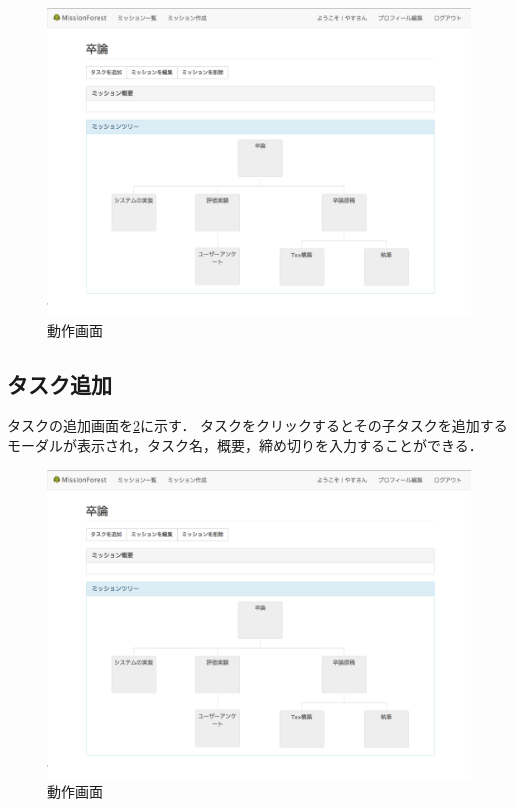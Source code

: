 \begin{figure}[t]
	\begin{center}
		\includegraphics[width=0.9\linewidth]{assets/img/interface_capture.png}
		\caption{動作画面}
		\label{img:intereface_capture_detail}
	\end{center}
\end{figure}

\subsection{タスク追加}
タスクの追加画面を\ref{img:intereface_capture_add}に示す．
タスクをクリックするとその子タスクを追加するモーダルが表示され，タスク名，概要，締め切りを入力することができる．

\begin{figure}[t]
	\begin{center}
		\includegraphics[width=0.9\linewidth]{assets/img/interface_capture.png}
		\caption{動作画面}
		\label{img:intereface_capture_add}
	\end{center}
\end{figure}


